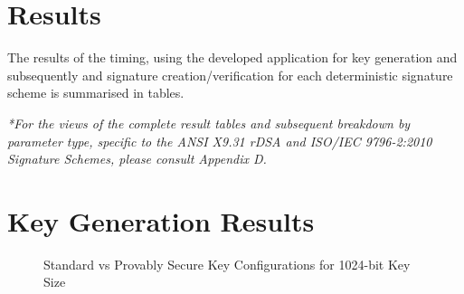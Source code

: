 \documentclass[]{final_report}
\theoremstyle{definition}
\begin{document}
\section{Results}
The results of the timing, using the developed application for key generation and subsequently and signature creation/verification for each deterministic signature scheme is summarised in tables. 

\textit{*For the views of the complete result tables and subsequent breakdown by parameter type, specific to the ANSI X9.31 rDSA and ISO/IEC 9796-2:2010 Signature Schemes, please consult Appendix D.}

\section{Key Generation Results}

\begin{figure}[H]

    \centering %
     \caption{Standard vs Provably Secure Key Configurations for 1024-bit Key Size}
    \begin{minipage}{\textwidth}
        \centering
        \label{fig:image1}
    \end{minipage}
        \label{keyGen_1024bit_table}
  \end{figure}
  
\end{document}
